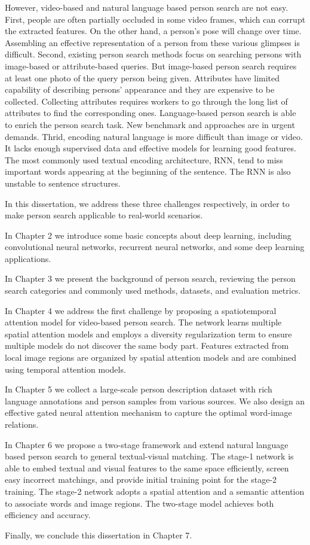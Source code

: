 However, video-based and natural language based person search are not easy. First, people are often partially occluded in some video frames, which can corrupt the extracted features. On the other hand, a person's pose will change over time. Assembling an effective representation of a person from these various glimpses is difficult.
Second, existing person search methods focus on searching persons with image-based or attribute-based queries. But image-based person search requires at least one photo of the query person being given.
Attributes have limited capability of describing persons' appearance and they are expensive to be collected. Collecting attributes requires workers to go through the long list of attributes to find the corresponding ones. Language-based person search is able to enrich the person search task. New benchmark and approaches are in urgent demands.
Thrid, encoding natural language is more difficult than image or video. It lacks enough supervised data and effective models for learning good features. The most commonly used textual encoding architecture, RNN, tend to miss important words appearing at the beginning of the sentence. The RNN is also unstable to sentence structures.

In this dissertation, we address these three challenges respectively, in order to make person search applicable to real-world scenarios.

In Chapter 2 we introduce some basic concepts about deep learning, including convolutional neural networks, recurrent neural networks, and some deep learning applications.

In Chapter 3 we present the background of person search, reviewing the person search categories and commonly used methods, datasets, and evaluation metrics.

In Chapter 4 we address the first challenge by proposing a spatiotemporal attention model for video-based person search. The network learns multiple spatial attention models and employs a diversity regularization term to ensure multiple models do not discover the same body part. Features extracted from local image regions are organized by spatial attention models and are combined using temporal attention models.

In Chapter 5 we collect a large-scale person description dataset with rich language annotations and person samples from various sources. We also design an effective gated neural attention mechanism to capture the optimal word-image relations.

In Chapter 6 we propose a two-stage framework and extend natural language based person search to general textual-visual matching. The stage-1 network is able to embed textual and visual features to the same space efficiently, screen easy incorrect matchings, and provide initial training point for the stage-2 training. The stage-2 network adopts a spatial attention and a semantic attention to associate words and image regions. The two-stage model achieves both efficiency and accuracy.

Finally, we conclude this dissertation in Chapter 7.